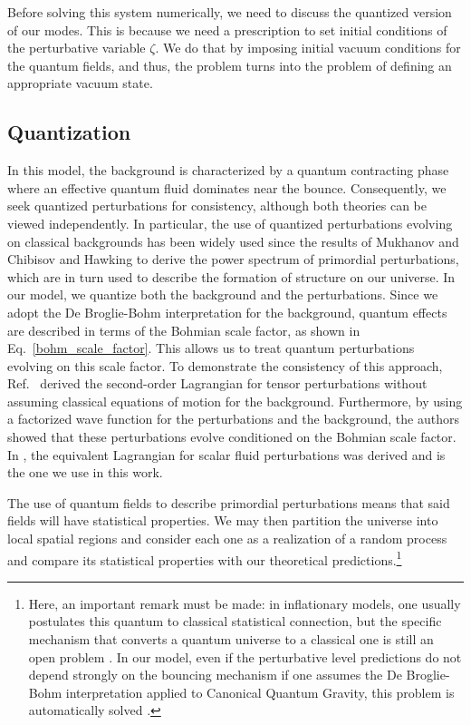 \documentclass[a4paper,11pt]{article}
\begin{document}
Before solving this system numerically, we need to discuss the quantized version of our modes. This is because we need a prescription to set initial conditions of the perturbative variable $\zeta$. We do that by imposing initial vacuum conditions for the quantum fields, and thus, the problem turns into the problem of defining an appropriate vacuum state.

\subsection{Quantization}

In this model, the background is characterized by a quantum contracting phase where an
effective quantum fluid dominates near the bounce. Consequently, we seek quantized
perturbations for consistency, although both theories can be viewed independently. In
particular, the use of quantized perturbations evolving on classical backgrounds has
been widely used since the results of Mukhanov and Chibisov \cite{mukhanov1981quantum}
and Hawking \cite{hawking1982quantum_fluctuations} to derive the power spectrum of
primordial perturbations, which are in turn used to describe the formation of structure
on our universe. {\color{red} In our model, we quantize both the background and the
		perturbations. Since we adopt the De Broglie-Bohm interpretation for the background,
		quantum effects are described in terms of the Bohmian scale factor, as shown in
		Eq.~\eqref{bohm_scale_factor}. This allows us to treat quantum perturbations evolving on
		this scale factor. To demonstrate the consistency of this approach,
		Ref.~\cite{Peter2005} derived the second-order Lagrangian for tensor perturbations
		without assuming classical equations of motion for the background. Furthermore, by using
		a factorized wave function for the perturbations and the background, the authors showed
		that these perturbations evolve conditioned on the Bohmian scale factor. In
		\cite{Vitenti2013}, the equivalent Lagrangian for scalar fluid perturbations was
		derived and is the one we use in this work.}

The use of quantum fields to describe primordial perturbations means that said fields
will have statistical properties. We may then partition the universe into local spatial
regions and consider each one as a realization of a random process and compare its
statistical properties with our theoretical predictions.\footnote{Here, an important
	remark must be made: in inflationary models, one usually postulates this quantum to
	classical statistical connection, but the specific mechanism that converts a quantum
	universe to a classical one is still an open problem
	\cite{nelson2021bouncing,mukhanov2005physical}. In our model, even if the perturbative
	level predictions do not depend strongly on the bouncing mechanism if one assumes the De
	Broglie-Bohm interpretation applied to Canonical Quantum Gravity, this problem is
	automatically solved \cite{nelson_bohm2023}. }
\end{document}
